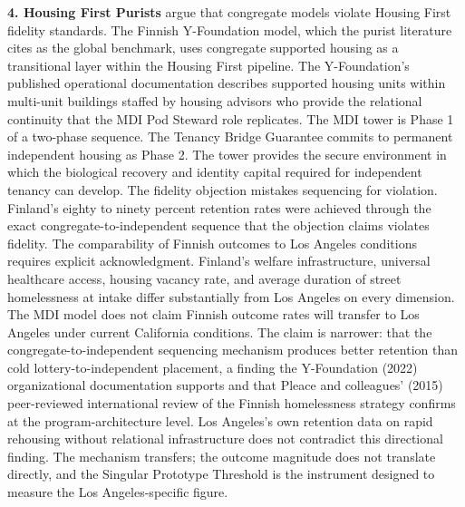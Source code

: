 \documentclass[12pt, letterpaper]{article}
\begin{document}
\textbf{4. Housing First Purists} argue that congregate models violate Housing First fidelity standards. The Finnish Y-Foundation model, which the purist literature cites as the global benchmark, uses congregate supported housing as a transitional layer within the Housing First pipeline. The Y-Foundation's published operational documentation describes supported housing units within multi-unit buildings staffed by housing advisors who provide the relational continuity that the MDI Pod Steward role replicates. The MDI tower is Phase 1 of a two-phase sequence. The Tenancy Bridge Guarantee commits to permanent independent housing as Phase 2. The tower provides the secure environment in which the biological recovery and identity capital required for independent tenancy can develop. The fidelity objection mistakes sequencing for violation. Finland's eighty to ninety percent retention rates were achieved through the exact congregate-to-independent sequence that the objection claims violates fidelity. The comparability of Finnish outcomes to Los Angeles conditions requires explicit acknowledgment. Finland's welfare infrastructure, universal healthcare access, housing vacancy rate, and average duration of street homelessness at intake differ substantially from Los Angeles on every dimension. The MDI model does not claim Finnish outcome rates will transfer to Los Angeles under current California conditions. The claim is narrower: that the congregate-to-independent sequencing mechanism produces better retention than cold lottery-to-independent placement, a finding the Y-Foundation (2022) organizational documentation supports and that Pleace and colleagues' (2015) peer-reviewed international review of the Finnish homelessness strategy confirms at the program-architecture level. Los Angeles's own retention data on rapid rehousing without relational infrastructure does not contradict this directional finding. The mechanism transfers; the outcome magnitude does not translate directly, and the Singular Prototype Threshold is the instrument designed to measure the Los Angeles-specific figure.
\end{document}
